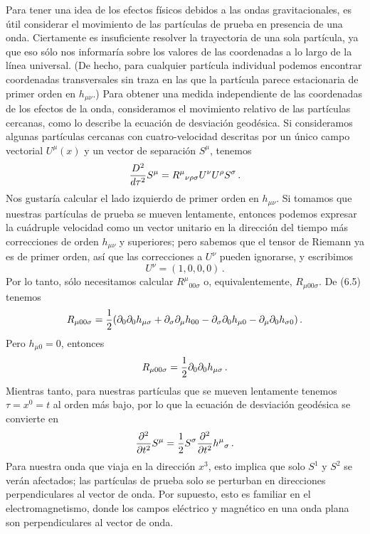 \documentclass[11pt,b5paper,openany,twoside]{book}
\newcommand{\mn}{{\mu\nu}}
\newcommand{\p}[1]{{\partial_{#1}}}
\begin{document}
Para tener una idea de los efectos físicos debidos a las ondas gravitacionales, es útil considerar el movimiento de las partículas de prueba en presencia de una onda.
Ciertamente es insuficiente resolver la trayectoria de una sola partícula, ya que eso sólo nos informaría sobre los valores de las coordenadas a lo largo de la línea universal.
(De hecho, para cualquier partícula individual podemos encontrar coordenadas transversales sin traza en las que la partícula parece estacionaria de primer orden en $h_\mn$.)
Para obtener una medida independiente de las coordenadas de los efectos de la onda, consideramos el movimiento relativo de las partículas cercanas, como lo describe la ecuación de desviación geodésica.
Si consideramos algunas partículas cercanas con cuatro-velocidad descritas por un único campo vectorial $U^\mu(x)$ y un vector de separación $S^\mu$, tenemos
\begin{equation}
{{D^2}\over{d\tau^2}}S^\mu = R^\mu{}_{\nu\rho\sigma}
U^\nu U^\rho S^\sigma\,.\label{6.58}
\end{equation}
Nos gustaría calcular el lado izquierdo de primer orden en $h_\mn$.
Si tomamos que nuestras partículas de prueba se mueven lentamente, entonces podemos expresar la cuádruple velocidad como un vector unitario en la dirección del tiempo más correcciones de orden $h_\mn$ y superiores; pero sabemos que el tensor de Riemann ya es de primer orden, así que las correcciones a $U^\nu$ pueden ignorarse, y escribimos
\begin{equation}
U^\nu = (1,0,0,0)\,.\label{6.59}
\end{equation}
Por lo tanto, sólo necesitamos calcular $R^\mu{}_{00\sigma}$ o, equivalentemente, $R_{\mu 00\sigma}$.
De (6.5) tenemos
\begin{equation}
R_{\mu 00\sigma}={1\over 2}(\p0\p0 h_{\mu\sigma} + \p\sigma
\p\mu h_{00} - \p\sigma\p0 h_{\mu 0} - \p\mu\p0 h_{\sigma 0})
\,.\label{6.60}
\end{equation}
Pero $h_{\mu 0}=0$, entonces
\begin{equation}
R_{\mu 00\sigma}={1\over 2}\p0\p0 h_{\mu\sigma}\,.\label{6.61}
\end{equation}
Mientras tanto, para nuestras partículas que se mueven lentamente tenemos $\tau=x^0=t$ al orden más bajo, por lo que la ecuación de desviación geodésica se convierte en
\begin{equation}
{{\partial^2}\over{\partial t^2}}S^\mu = {1\over 2}S^\sigma
{{\partial^2}\over{\partial t^2}} h^\mu{}_\sigma\,.\label{6.62}
\end{equation}
Para nuestra onda que viaja en la dirección $x^3$, esto implica que solo $S^1$ y $S^2$ se verán afectados; las partículas de prueba solo se perturban en direcciones perpendiculares al vector de onda.
Por supuesto, esto es familiar en el electromagnetismo, donde los campos eléctrico y magnético en una onda plana son perpendiculares al vector de onda.
\end{document}
